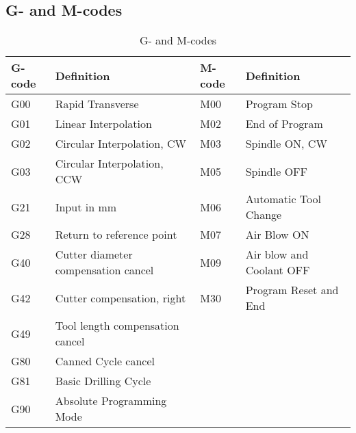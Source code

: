 \section*{}
\appendix
{}
\subsection{G- and M-codes}
\begin{table}[!h]
	\caption[G- and M-Codes]{G- and M-codes}
	
	\begin{center}
		\centering
		\begin{tabular}{|l|l|l|l|}
			\hline
			\textbf{G-code} & \textbf{Definition} &\textbf{ M-code} & \textbf{Definition}\\
			\hline
			
			G00 & Rapid Transverse & M00 & Program Stop\\
			G01 & Linear Interpolation &  M02 & End of Program \\
			G02 & Circular Interpolation, CW & M03 & Spindle ON, CW \\
			G03 & Circular Interpolation, CCW& M05 & Spindle OFF \\
			G21 & Input in mm & M06 & Automatic Tool Change\\
			G28 & Return to reference point & M07 & Air Blow ON \\
			G40 & Cutter diameter compensation cancel&M09 & Air blow and Coolant OFF\\
			G42 & Cutter compensation, right &  M30 & Program Reset and End\\
			G49 & Tool length compensation cancel &&\\
			G80 & Canned Cycle cancel&&\\
			G81 & Basic Drilling Cycle&&\\
			G90 & Absolute Programming Mode&&\\
			\hline
		\end{tabular}
	\end{center}
\end{table}
